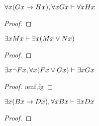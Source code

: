\begin{earg}

\noindent\begin{minipage}{0.99\textwidth}
\item $\forall x(Gx \rightarrow Hx), \forall xGx \vdash \forall xHx$

\begin{proof}
	 \pr{}
	 \pr{}
	 
	 
	 
	 
\end{proof}
\bigskip
\end{minipage}

\noindent\begin{minipage}{0.99\textwidth}
\item $\exists xMx \vdash \exists x(Mx \vee Nx)$

\begin{proof}
	 \pr{}
	\open
		 \as{}
		 
		 
	\close
	 
\end{proof}
\bigskip
\end{minipage}

\noindent\begin{minipage}{0.99\textwidth}
\item $\exists x {\neg} Fx, \forall x(Fx \vee Gx) \vdash \exists xGx$

\begin{proof}
	 \pr{}
	 \pr{}
	\open
		 \as{}
		 
		 \oe{nf,fg}
		 
	\close
	 
\end{proof}
\bigskip
\end{minipage}

\noindent\begin{minipage}{0.99\textwidth}
\item $\exists x(Bx \rightarrow Dx), \forall xBx \vdash \exists xDx$

\begin{proof}
	 \pr{}
	 \pr{}
	\open
		 \as{}
		 
		 
		 
	\close
	 
\end{proof}
\bigskip
\end{minipage}


\end{earg}
